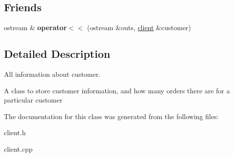 \subsection*{Friends}
\begin{CompactItemize}
\item 
\hypertarget{classclient_9f09335faadcf7eaacdcd326c26f5d99}{
ostream \& {\bf operator$<$$<$} (ostream \&outs, \hyperlink{classclient}{client} \&customer)}
\label{classclient_9f09335faadcf7eaacdcd326c26f5d99}

\end{CompactItemize}


\subsection{Detailed Description}
All information about customer. 

A class to store customer information, and how many orders there are for a particular customer 



The documentation for this class was generated from the following files:\begin{CompactItemize}
\item 
client.h\item 
client.cpp\end{CompactItemize}
